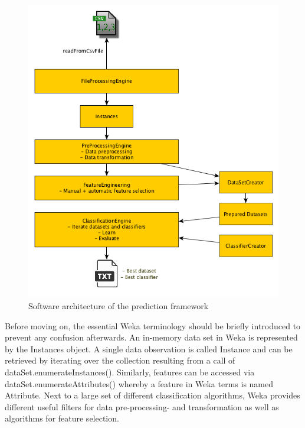 \begin{figure}
	\centering
	\includegraphics[width=1.0\textwidth]{img/softwareArchitecture.png}
	\caption{Software architecture of the prediction framework}
	\label{fig:softwareArchitecture}
\end{figure} 

Before moving on, the essential Weka terminology should be briefly introduced to prevent any confusion afterwards. An in-memory data set in Weka is represented by the Instances object. A single data observation is called Instance and can be retrieved by iterating over the collection resulting from a call of dataSet.enumerateInstances(). Similarly, features can be accessed via dataSet.enumerateAttributes() whereby a feature in Weka terms is named Attribute. Next to a large set of different classification algorithms, Weka provides different useful filters for data pre-processing- and transformation as well as algorithms for feature selection. 


